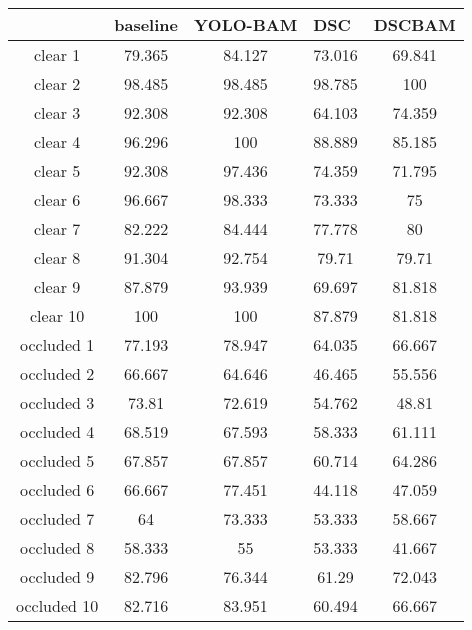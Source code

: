 \centering
\begin{tabular}{ccccc}
        & \multicolumn{1}{l}{baseline} & \multicolumn{1}{l}{YOLO-BAM} & \multicolumn{1}{l}{DSC}       & \multicolumn{1}{l}{DSCBAM} \\ \hline
clear 1     & 79.365 & 84.127 & 73.016 & 69.841 \\ \hline
clear 2     & 98.485 & 98.485 & 98.785 & 100    \\ \hline
clear 3     & 92.308 & 92.308 & 64.103 & 74.359 \\ \hline
clear 4     & 96.296 & 100    & 88.889 & 85.185 \\ \hline
clear 5     & 92.308 & 97.436 & 74.359 & 71.795 \\ \hline
clear 6     & 96.667 & 98.333 & 73.333 & 75     \\ \hline
clear 7     & 82.222 & 84.444 & 77.778 & 80     \\ \hline
clear 8     & 91.304 & 92.754 & 79.71  & 79.71  \\ \hline
clear 9     & 87.879 & 93.939 & 69.697 & 81.818 \\ \hline
clear 10    & 100    & 100    & 87.879 & 81.818 \\ \hline
occluded 1  & 77.193 & 78.947 & 64.035 & 66.667 \\ \hline
occluded 2  & 66.667 & 64.646 & 46.465 & 55.556 \\ \hline
occluded 3  & 73.81  & 72.619 & 54.762 & 48.81  \\ \hline
occluded 4  & 68.519 & 67.593 & 58.333 & 61.111 \\ \hline
occluded 5  & 67.857 & 67.857 & 60.714 & 64.286 \\ \hline
occluded 6  & 66.667 & 77.451 & 44.118 & 47.059 \\ \hline
occluded 7  & 64     & 73.333 & 53.333 & 58.667 \\ \hline
occluded 8  & 58.333 & 55     & 53.333 & 41.667 \\ \hline
occluded 9  & 82.796 & 76.344 & 61.29  & 72.043 \\ \hline
occluded 10 & 82.716 & 83.951 & 60.494 & 66.667 \\ \hline
\end{tabular}

